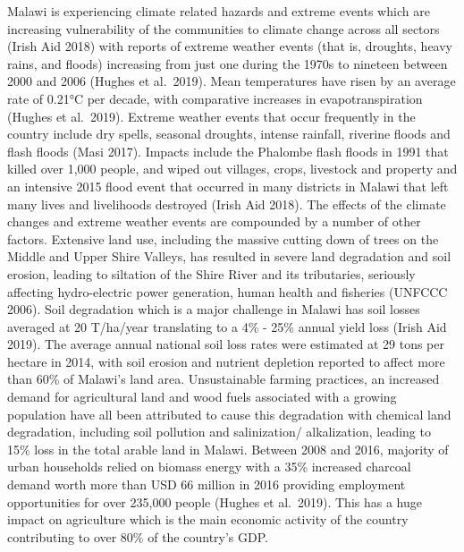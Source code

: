 \documentclass[
]{book}
\begin{document}
Malawi is experiencing climate related hazards and extreme events which are increasing vulnerability of the communities to climate change across all sectors (Irish Aid 2018) with reports of extreme weather events (that is, droughts, heavy rains, and floods) increasing from just one during the 1970s to nineteen between 2000 and 2006 (Hughes et al.~2019). Mean temperatures have risen by an average rate of 0.21°C per decade, with comparative increases in evapotranspiration (Hughes et al.~2019). Extreme weather events that occur frequently in the country include dry spells, seasonal droughts, intense rainfall, riverine floods and flash floods (Masi 2017). Impacts include the Phalombe flash floods in 1991 that killed over 1,000 people, and wiped out villages, crops, livestock and property and an intensive 2015 flood event that occurred in many districts in Malawi that left many lives and livelihoods destroyed (Irish Aid 2018). The effects of the climate changes and extreme weather events are compounded by a number of other factors. Extensive land use, including the massive cutting down of trees on the Middle and Upper Shire Valleys, has resulted in severe land degradation and soil erosion, leading to siltation of the Shire River and its tributaries, seriously affecting hydro-electric power generation, human health and fisheries (UNFCCC 2006). Soil degradation which is a major challenge in Malawi has soil losses averaged at 20 T/ha/year translating to a 4\% - 25\% annual yield loss (Irish Aid 2019). The average annual national soil loss rates were estimated at 29 tons per hectare in 2014, with soil erosion and nutrient depletion reported to affect more than 60\% of Malawi's land area. Unsustainable farming practices, an increased demand for agricultural land and wood fuels associated with a growing population have all been attributed to cause this degradation with chemical land degradation, including soil pollution and salinization/ alkalization, leading to 15\% loss in the total arable land in Malawi. Between 2008 and 2016, majority of urban households relied on biomass energy with a 35\% increased charcoal demand worth more than USD 66 million in 2016 providing employment opportunities for over 235,000 people (Hughes et al.~2019). This has a huge impact on agriculture which is the main economic activity of the country contributing to over 80\% of the country's GDP.
\end{document}

